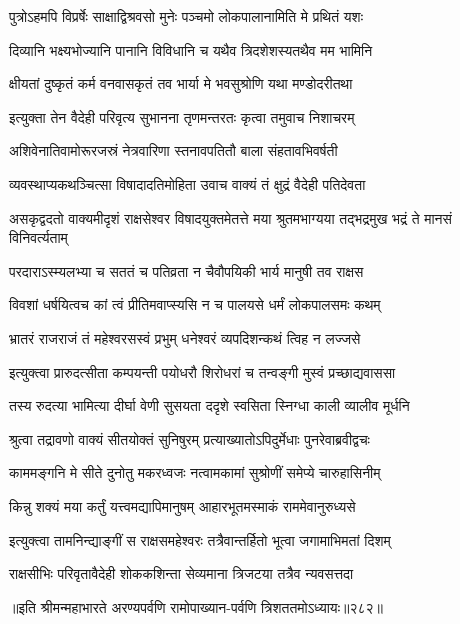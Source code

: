 \twolineshloka
{पुत्रोऽहमपि विप्रर्षेः साक्षाद्विश्रवसो मुनेः}
{पञ्चमो लोकपालानामिति मे प्रथितं यशः}


\twolineshloka
{दिव्यानि भक्ष्यभोज्यानि पानानि विविधानि च}
{यथैव त्रिदशेशस्यतथैव मम भामिनि}


\twolineshloka
{क्षीयतां दुष्कृतं कर्म वनवासकृतं तव}
{भार्या मे भवसुश्रोणि यथा मण्डोदरीतथा}


\twolineshloka
{इत्युक्ता तेन वैदेही परिवृत्य सुभानना}
{तृणमन्तरतः कृत्वा तमुवाच निशाचरम्}


\twolineshloka
{अशिवेनातिवामोरूरजस्रं नेत्रवारिणा}
{स्तनावपतितौ बाला संहतावभिवर्षती}


\twolineshloka
{व्यवस्थाप्यकथञ्चित्सा विषादादतिमोहिता}
{उवाच वाक्यं तं क्षुद्रं वैदेही पतिदेवता}


\threelineshloka
{असकृद्वदतो वाक्यमीदृशं राक्षसेश्वर}
{विषादयुक्तमेतत्ते मया श्रुतमभाग्यया}
{तद्भद्रमुख भद्रं ते मानसं विनिवर्त्यताम्}


\twolineshloka
{परदाराऽस्म्यलभ्या च सततं च पतिव्रता}
{न चैवौपयिकी भार्य मानुषी तव राक्षस}


\twolineshloka
{विवशां धर्षयित्वच कां त्वं प्रीतिमवाप्स्यसि}
{न च पालयसे धर्मं लोकपालसमः कथम्}


\twolineshloka
{भ्रातरं राजराजं तं महेश्वरसस्वं प्रभुम्}
{धनेश्वरं व्यपदिशन्कथं त्विह न लज्जसे}


\twolineshloka
{इत्युक्त्वा प्रारुदत्सीता कम्पयन्ती पयोधरौ}
{शिरोधरां च तन्वङ्गी मुस्वं प्रच्छाद्यवाससा}


\twolineshloka
{तस्य रुदत्या भामित्या दीर्घा वेणी सुसयता}
{ददृशे स्वसिता स्निग्धा काली व्यालीव मूर्धनि}


\twolineshloka
{श्रुत्वा तद्रावणो वाक्यं सीतयोक्तं सुनिषुरम्}
{प्रत्याख्यातोऽपिदुर्मेधाः पुनरेवाब्रवीद्वचः}


\twolineshloka
{काममङ्गनि मे सीते दुनोतु मकरध्वजः}
{नत्वामकामां सुश्रोणीं समेप्ये चारुहासिनीम्}


\twolineshloka
{किन्नु शक्यं मया कर्तुं यत्त्वमद्यापिमानुषम्}
{आहारभूतमस्माकं राममेवानुरुध्यसे}


\twolineshloka
{इत्युक्त्वा तामनिन्द्याङ्गीं स राक्षसमहेश्वरः}
{तत्रैवान्तर्हितो भूत्वा जगामाभिमतां दिशम्}


\twolineshloka
{राक्षसीभिः परिवृतावैदेही शोककशिन्ता}
{सेव्यमाना त्रिजटया तत्रैव न्यवसत्तदा}


॥इति श्रीमन्महाभारते अरण्यपर्वणि रामोपाख्यान-पर्वणि त्रिशततमोऽध्यायः॥२८२॥




